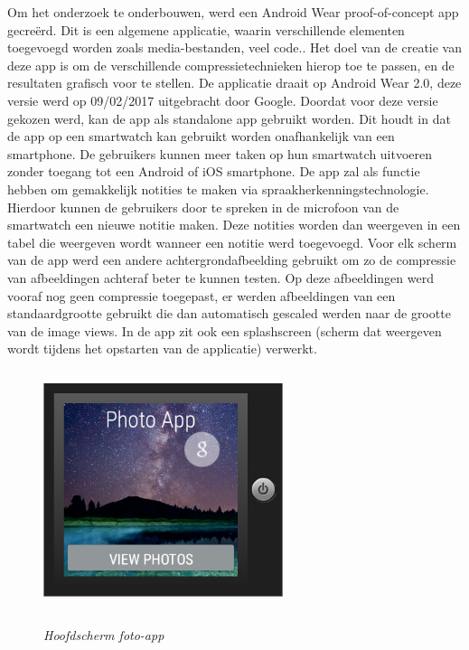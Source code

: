 Om het onderzoek te onderbouwen, werd een Android Wear proof-of-concept app gecreërd. Dit is een algemene applicatie, waarin verschillende elementen toegevoegd worden zoals media-bestanden, veel code.. Het doel van de creatie van deze app is om de verschillende compressietechnieken hierop toe te passen, en de resultaten grafisch voor te stellen. De applicatie draait op Android Wear 2.0, deze versie werd op 09/02/2017 uitgebracht door Google.\autocite{Google} Doordat voor deze versie gekozen werd, kan de app als standalone app gebruikt worden. Dit houdt in dat de app op een smartwatch kan gebruikt worden onafhankelijk van een smartphone. De gebruikers kunnen meer taken op hun smartwatch uitvoeren zonder toegang tot een Android of iOS smartphone. De app zal als functie hebben om gemakkelijk notities te maken via spraakherkenningstechnologie. Hierdoor kunnen de gebruikers door te spreken in de microfoon van de smartwatch een nieuwe notitie maken. Deze notities worden dan weergeven in een tabel die weergeven wordt wanneer een notitie werd toegevoegd. Voor elk scherm van de app werd een andere achtergrondafbeelding gebruikt om zo de compressie van afbeeldingen achteraf beter te kunnen testen. Op deze afbeeldingen werd vooraf nog geen compressie toegepast, er werden afbeeldingen van een standaardgrootte gebruikt die dan automatisch gescaled werden naar de grootte van de image views. In de app zit ook een splashscreen (scherm dat weergeven wordt tijdens het opstarten van de applicatie) verwerkt. 
\begin{figure}[H]
	\centering
	\caption{\textit{Hoofdscherm foto-app}}
	\includegraphics[width=7cm, height=7cm, keepaspectratio]{img/photoappmain}\\[.5cm]
\end{figure}

